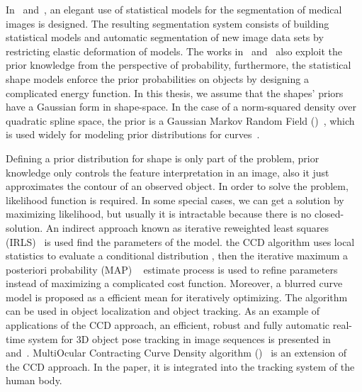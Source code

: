 In~\cite{kelemen1999three} and~\cite{kelemen1999elastic}, an elegant
use of statistical models for the segmentation of medical images is
designed.  The resulting segmentation system consists of building
statistical models and automatic segmentation of new image data
sets by restricting elastic deformation of models.  The works
in~\cite{sclaroff2001deformable} and~\cite{liu1999deformable} also
exploit the prior knowledge from the perspective of probability,
furthermore, the statistical shape models enforce the prior
probabilities on objects by designing a complicated energy function.  In this thesis, we assume that the shapes' priors have a Gaussian form in
shape-space. In the case of a norm-squared density over  quadratic spline space,
the prior is a Gaussian Markov Random Field
()~\cite{blake1998active}, which is used widely  for modeling
prior distributions for curves~\cite{storvik1994bayesian}.

Defining a prior distribution for shape is only part of the
problem, prior knowledge only controls the feature interpretation in an
image, also it just approximates the contour of an observed object. In
order to solve the problem, likelihood function is required. In some
special cases, we can get a solution by maximizing likelihood, but
usually it is intractable because there is no closed-solution. An indirect
approach known as iterative reweighted least squares
(IRLS)~\cite{bishop2006pattern} is used find the parameters of the model.
the CCD  algorithm uses local statistics to evaluate a conditional distribution
, then the iterative maximum a posteriori probability (MAP)
~\cite{sorenson1980parameter} estimate process is used to refine
parameters instead of maximizing a complicated cost function. 
Moreover, a blurred curve model is proposed as a efficient mean for iteratively optimizing. The algorithm
can be used in object localization and object tracking. As an example
of applications of the CCD approach, an efficient, robust and fully
automatic real-time system for 3D object pose tracking in
image sequences is presented in~\cite{panin2006fully}
and~\cite{panin2006efficient}. MultiOcular Contracting Curve Density
algorithm ()~\cite{hahn2007tracking} is an extension of the CCD
approach. In the paper, it is integrated into the tracking system of
the human body. 

